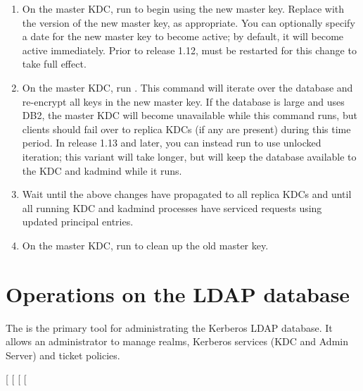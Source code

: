 \documentclass[letterpaper,10pt,english]{sphinxmanual}
\begin{document}
\begin{enumerate}
\item {} 
On the master KDC, run  to begin using the
new master key.  Replace  with the version of the new master
key, as appropriate.  You can optionally specify a date for the new
master key to become active; by default, it will become active
immediately.  Prior to release 1.12, {\hyperref[\detokenize{admin/admin_commands/kadmind:kadmind-8}]{}} must be
restarted for this change to take full effect.

\item {} 
On the master KDC, run .  This
command will iterate over the database and re-encrypt all keys in
the new master key.  If the database is large and uses DB2, the
master KDC will become unavailable while this command runs, but
clients should fail over to replica KDCs (if any are present)
during this time period.  In release 1.13 and later, you can
instead run  to
use unlocked iteration; this variant will take longer, but will
keep the database available to the KDC and kadmind while it runs.

\item {} 
Wait until the above changes have propagated to all replica KDCs
and until all running KDC and kadmind processes have serviced
requests using updated principal entries.

\item {} 
On the master KDC, run  to clean up the
old master key.

\end{enumerate}


\section{Operations on the LDAP database}
\label{\detokenize{admin/database:operations-on-the-ldap-database}}\label{\detokenize{admin/database:ops-on-ldap}}
The {\hyperref[\detokenize{admin/admin_commands/kdb5_ldap_util:kdb5-ldap-util-8}]{}} is the primary tool for administrating
the Kerberos LDAP database.  It allows an administrator to manage
realms, Kerberos services (KDC and Admin Server) and ticket policies.

{[}  {[} \sphinxstyleemphasis{passwd}{]}{]}
{[} \sphinxstyleemphasis{ldapuri}{]}
{[}\sphinxstyleemphasis{command\_options}{]}
\end{document}
